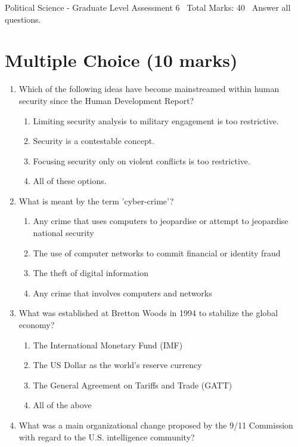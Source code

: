 \documentclass[12pt]{article}
\begin{document}
\begin{center}
Political Science - Graduate Level Assessment 6 \
Total Marks: 40 \
Answer all questions.
\end{center}

\section*{Multiple Choice (10 marks)}
\begin{enumerate}[label=\arabic*.]
\item Which of the following ideas have become mainstreamed within human security since the Human Development Report?
\begin{enumerate}[label=(\alph*)]
    \item Limiting security analysis to military engagement is too restrictive.
    \item Security is a contestable concept.
    \item Focusing security only on violent conflicts is too restrictive.
    \item All of these options.
\end{enumerate}
\item What is meant by the term 'cyber-crime'?
\begin{enumerate}[label=(\alph*)]
    \item Any crime that uses computers to jeopardise or attempt to jeopardise national security
    \item The use of computer networks to commit financial or identity fraud
    \item The theft of digital information
    \item Any crime that involves computers and networks
\end{enumerate}
\item What was established at Bretton Woods in 1994 to stabilize the global economy?
\begin{enumerate}[label=(\alph*)]
    \item The International Monetary Fund (IMF)
    \item The US Dollar as the world's reserve currency
    \item The General Agreement on Tariffs and Trade (GATT)
    \item All of the above
\end{enumerate}
\item What was a main organizational change proposed by the 9/11 Commission with regard to the U.S. intelligence community?

\end{enumerate}
\end{document}
